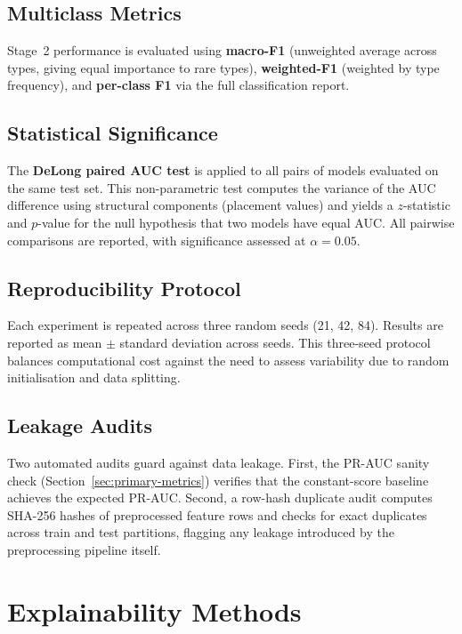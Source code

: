 \documentclass[12pt,a4paper]{report}
\begin{document}
\subsection{Multiclass Metrics}
\label{sec:multiclass-metrics}

Stage~2 performance is evaluated using \textbf{macro-F1} (unweighted average across types, giving equal importance to rare types), \textbf{weighted-F1} (weighted by type frequency), and \textbf{per-class F1} via the full classification report.

\subsection{Statistical Significance}
\label{sec:delong}

The \textbf{DeLong paired AUC test} \citep{deyoung2020} is applied to all pairs of models evaluated on the same test set. This non-parametric test computes the variance of the AUC difference using structural components (placement values) and yields a $z$-statistic and $p$-value for the null hypothesis that two models have equal AUC. All pairwise comparisons are reported, with significance assessed at $\alpha = 0.05$.

\subsection{Reproducibility Protocol}
\label{sec:reproducibility}

Each experiment is repeated across three random seeds (21, 42, 84). Results are reported as mean $\pm$ standard deviation across seeds. This three-seed protocol balances computational cost against the need to assess variability due to random initialisation and data splitting.

\subsection{Leakage Audits}
\label{sec:leakage-audits}

Two automated audits guard against data leakage. First, the PR-AUC sanity check (Section~\ref{sec:primary-metrics}) verifies that the constant-score baseline achieves the expected PR-AUC. Second, a row-hash duplicate audit computes SHA-256 hashes of preprocessed feature rows and checks for exact duplicates across train and test partitions, flagging any leakage introduced by the preprocessing pipeline itself.

\section{Explainability Methods}
\label{sec:xai-methods}
\end{document}
